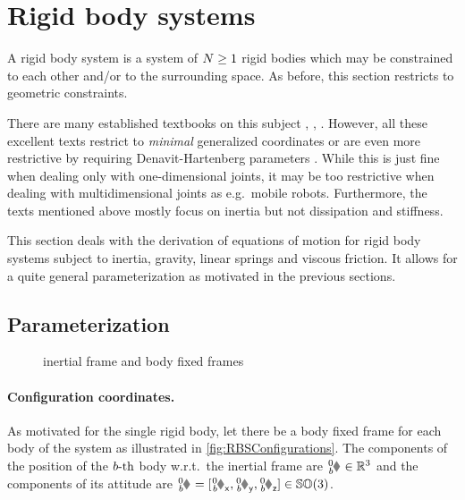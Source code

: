 \section{Rigid body systems}\label{sec:RBSRigidBodySys}
A rigid body system is a system of $N \geq 1$ rigid bodies which may be constrained to each other and/or to the surrounding space.
As before, this section restricts to geometric constraints.

There are many established textbooks on this subject \eg \cite{Schwertassek:MultibodySystems}, \cite{Murray:Robotic}, \cite{Kane:Dynamics}.
However, all these excellent texts restrict to \textit{minimal} generalized coordinates or are even more restrictive by requiring Denavit-Hartenberg parameters \cite{DenavitHartenbergParam}.
While this is just fine when dealing only with one-dimensional joints, it may be too restrictive when dealing with multidimensional joints as e.g.\ mobile robots.
Furthermore, the texts mentioned above mostly focus on inertia but not dissipation and stiffness.

This section deals with the derivation of equations of motion for rigid body systems subject to inertia, gravity, linear springs and viscous friction.
It allows for a quite general parameterization as motivated in the previous sections.

\subsection{Parameterization}\label{sec:RBSParameterization}
\begin{figure}[ht]
 \centering
 
 \caption{inertial frame and body fixed frames}
 \label{fig:RBSConfigurations}
\end{figure}

\paragraph{Configuration coordinates.}
As motivated for the single rigid body, let there be a body fixed frame for each body of the system as illustrated in \autoref{fig:RBSConfigurations}.
The components of the position of the $b\text{-th}$ body w.r.t.\ the inertial frame are $\bodyPos{0}{\BidxII} \in \RealNum^3$ and the components of its attitude are $\bodyRot{0}{\BidxII} = [\bodyRotx{0}{\BidxII}, \bodyRoty{0}{\BidxII}, \bodyRotz{0}{\BidxII}] \in \SpecialOrthogonalGroup(3)$.

